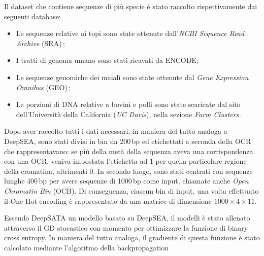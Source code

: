 Il dataset che contiene sequenze di più specie è stato raccolto rispettivamente dai seguenti database:
\begin{itemize}
    \item Le sequenze relative ai topi sono state ottenute dall'\textit{\acs{NCBI} Sequence Read Archive} (\acs{SRA})\,\cite{ncbisra};
    \item I tratti di genoma umano sono stati ricavati da \acs{ENCODE};
    \item Le sequenze genomiche dei maiali sono state ottenute dal \textit{Gene Expression Omnibus} (\acs{GEO})\,\cite{ncbigeo};
    \item Le porzioni di \acs{DNA} relative a bovini e polli sono state scaricate dal sito dell'Università della California (\textsl{UC Davis}), nella sezione \textit{Farm Clusters}\,\cite{ucdavis}.
\end{itemize} 
% 
\noindent Dopo aver raccolto tutti i dati necessari, in maniera del tutto analoga a DeepSEA, sono stati divisi in bin da 200\,bp ed etichettati a seconda della \acs{OCR} che rappresentavano: se più della metà della sequenza aveva una corrispondenza con una \acs{OCR}, veniva impostata l'etichetta ad 1 per quella particolare regione della cromatina, altrimenti 0. In secondo luogo, sono stati centrati con sequenze lunghe 400\,bp per avere sequenze di 1000\,bp come input, chiamate anche \textit{Open Chromatin Bin} (\acs{OCB}). Di conseguenza, ciascun bin di input, una volta effettuato il One-Hot encoding è rappresentato da una matrice di dimensione $1000 \times 4 \times 11$.

Essendo DeepSATA un modello basato su DeepSEA, il modelli è stato allenato attraverso il \acs{GD} stocastico con momento per ottimizzare la funzione di binary cross entropy. In maniera del tutto analoga, il gradiente di questa funzione è stato calcolato mediante l'algoritmo della backpropagation

